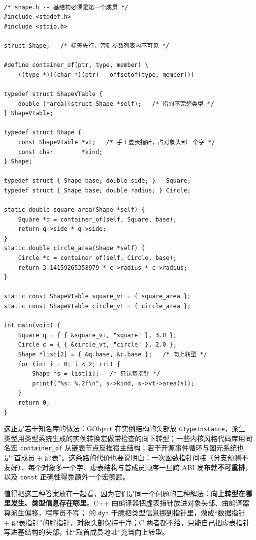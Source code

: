 \documentclass[12pt,a4paper,fontset=fandol]{ctexbook}
\newcommand{\clabel}{%
  \tcbox[on line,colback=cheadbg,colframe=cheadbg,
    boxrule=0pt,arc=1pt,left=2pt,right=2pt,top=1pt,bottom=1pt,
    colupper=white,fontupper=\scriptsize\bfseries]{C}}
\newcommand{\rustlabel}{%
  \tcbox[on line,colback=rustheadbg,colframe=rustheadbg,
    boxrule=0pt,arc=1pt,left=2pt,right=2pt,top=1pt,bottom=1pt,
    colupper=white,fontupper=\scriptsize\bfseries]{Rust}}
\newcommand{\cpp}[1]{C++#1}
\newcommand{\kw}[1]{\texttt{#1}}
\begin{document}
\clabel\ \begin{lstlisting}[style=cstyle,caption={首成员 + 手工虚表：C 里的一次虚函数派发}]
/* shape.h -- 基结构必须是第一个成员 */
#include <stddef.h>
#include <stdio.h>

struct Shape;   /* 标签先行，否则参数列表内不可见 */

#define container_of(ptr, type, member) \
    ((type *)((char *)(ptr) - offsetof(type, member)))

typedef struct ShapeVTable {
    double (*area)(struct Shape *self);   /* 指向不完整类型 */
} ShapeVTable;

typedef struct Shape {
    const ShapeVTable *vt;   /* 手工虚表指针，占对象头部一个字 */
    const char        *kind;
} Shape;

typedef struct { Shape base; double side; }   Square;
typedef struct { Shape base; double radius; } Circle;

static double square_area(Shape *self) {
    Square *q = container_of(self, Square, base);
    return q->side * q->side;
}
static double circle_area(Shape *self) {
    Circle *c = container_of(self, Circle, base);
    return 3.14159265358979 * c->radius * c->radius;
}

static const ShapeVTable square_vt = { square_area };
static const ShapeVTable circle_vt = { circle_area };

int main(void) {
    Square q = { { &square_vt, "square" }, 3.0 };
    Circle c = { { &circle_vt, "circle" }, 2.0 };
    Shape *list[2] = { &q.base, &c.base };   /* 向上转型 */
    for (int i = 0; i < 2; ++i) {
        Shape *s = list[i];   /* 只认基指针 */
        printf("%s: %.2f\n", s->kind, s->vt->area(s));
    }
    return 0;
}
\end{lstlisting}

这正是若干知名库的做法：GObject 在实例结构的头部放 \kw{GTypeInstance}，派生类型用类型系统生成的实例转换宏做带检查的向下转型；一些内核风格代码库用同名宏 \kw{container\_of} 从链表节点反推宿主结构；若干开源事件循环与图元系统也是“首成员 + 虚表”。这条路的代价也要说明白：一次函数指针间接（分支预测不友好）、每个对象多一个字、虚表结构与首成员顺序一旦跨 ABI 发布就\textbf{不可重排}，以及 \kw{const} 正确性得靠额外一个宏照顾。

值得把这三种答案放在一起看，因为它们是同一个问题的三种解法：\textbf{向上转型在哪里发生、类型信息存在哪里}。\cpp{} 由编译器把虚表指针放进对象头部、由编译器算派生偏移，程序员不写；\rustlabel{} 的 \kw{dyn} 干脆把类型信息挪到指针里，做成“数据指针 + 虚表指针”的胖指针，对象头部保持干净；C 两者都不给，只能自己把虚表指针写进基结构的头部，让“取首成员地址”充当向上转型。
\end{document}
